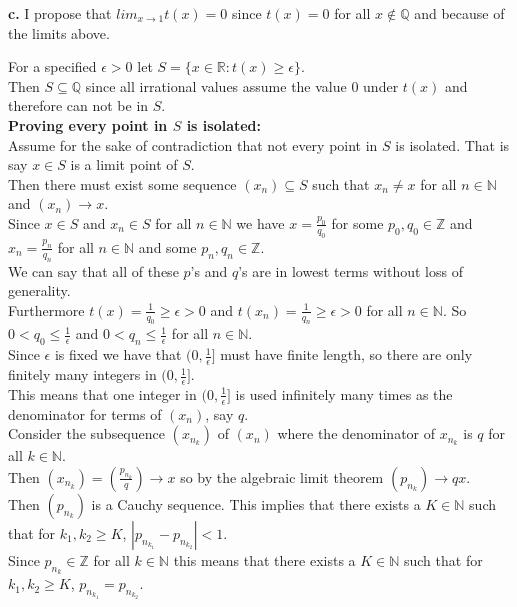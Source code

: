 \documentclass{article}
\begin{document}
{\Large \textbf{c.}} I propose that $lim_{x\rightarrow 1} t(x) = 0$ since $t(x) = 0$ for all $x\notin\mathbb{Q}$ and because of the limits above.
\begin{center}
    \doublespacing
    For a specified $\epsilon > 0$ let $S =\{x\in\mathbb{R} : t(x)\geq\epsilon\}$.
    \\Then $S\subseteq\mathbb{Q}$ since all irrational values assume the value 0 under $t(x)$ and therefore can not be in $S$.
    \\\textbf{Proving every point in $S$ is isolated:}
    \\Assume for the sake of contradiction that not every point in $S$ is isolated. That is say $x\in S$ is a limit point of $S$.
    \\Then there must exist some sequence $(x_n)\subseteq S$ such that $x_n\neq x$ for all $n\in\mathbb{N}$ and $(x_n)\rightarrow x$.
    \\Since $x\in S$ and $x_n\in S$ for all $n\in\mathbb{N}$ we have $x =\frac{p_0}{q_0}$ for some $p_0, q_0\in\mathbb{Z}$ and $x_n =\frac{p_n}{q_n}$ for all $n\in\mathbb{N}$ and some $p_n, q_n\in\mathbb{Z}$.
    \\We can say that all of these $p$'s and $q$'s are in lowest terms without loss of generality.
    \\Furthermore $t(x) =\frac{1}{q_0}\geq\epsilon > 0$ and $t(x_n) =\frac{1}{q_n}\geq\epsilon > 0$ for all $n\in\mathbb{N}$. So $0 < q_0\leq\frac{1}{\epsilon}$ and $0 < q_n\leq\frac{1}{\epsilon}$ for all $n\in\mathbb{N}$.
    \\Since $\epsilon$ is fixed we have that $(0,\frac{1}{\epsilon}]$ must have finite length, so there are only finitely many integers in $(0,\frac{1}{\epsilon}]$.
    \\This means that one integer in $(0,\frac{1}{\epsilon}]$ is used infinitely many times as the denominator for terms of $(x_n)$, say $q$.
    \\Consider the subsequence $(x_{n_k})$ of $(x_n)$ where the denominator of $x_{n_k}$ is $q$ for all $k\in\mathbb{N}$.
    \\Then $(x_{n_k}) = (\frac{p_{n_k}}{q})\rightarrow x$ so by the algebraic limit theorem $(p_{n_k})\rightarrow qx$.
    \\Then $(p_{n_k})$ is a Cauchy sequence. This implies that there exists a $K\in\mathbb{N}$ such that for $k_1, k_2\geq K$, $|p_{n_{k_1}} - p_{n_{k_2}}| < 1$.
    \\Since $p_{n_k}\in\mathbb{Z}$ for all $k\in\mathbb{N}$ this means that there exists a $K\in\mathbb{N}$ such that for $k_1, k_2\geq K$, $p_{n_{k_1}} = p_{n_{k_2}}$.

\end{center}
\end{document}
